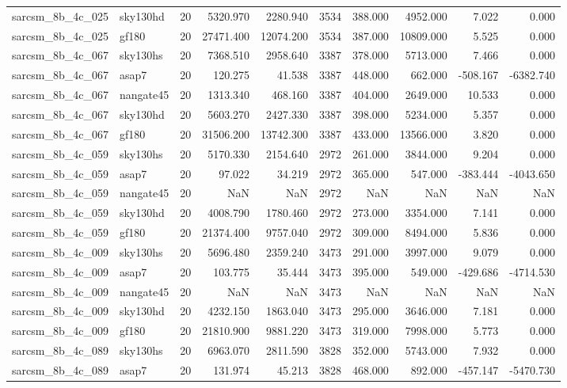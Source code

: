 \begin{longtable}{llrrrrrrrr}
sarcsm\_8b\_4c\_025 & sky130hd & 20 & 5320.970 & 2280.940 & 3534 & 388.000 & 4952.000 & 7.022 & 0.000 \\
sarcsm\_8b\_4c\_025 & gf180 & 20 & 27471.400 & 12074.200 & 3534 & 387.000 & 10809.000 & 5.525 & 0.000 \\
sarcsm\_8b\_4c\_067 & sky130hs & 20 & 7368.510 & 2958.640 & 3387 & 378.000 & 5713.000 & 7.466 & 0.000 \\
sarcsm\_8b\_4c\_067 & asap7 & 20 & 120.275 & 41.538 & 3387 & 448.000 & 662.000 & -508.167 & -6382.740 \\
sarcsm\_8b\_4c\_067 & nangate45 & 20 & 1313.340 & 468.160 & 3387 & 404.000 & 2649.000 & 10.533 & 0.000 \\
sarcsm\_8b\_4c\_067 & sky130hd & 20 & 5603.270 & 2427.330 & 3387 & 398.000 & 5234.000 & 5.357 & 0.000 \\
sarcsm\_8b\_4c\_067 & gf180 & 20 & 31506.200 & 13742.300 & 3387 & 433.000 & 13566.000 & 3.820 & 0.000 \\
sarcsm\_8b\_4c\_059 & sky130hs & 20 & 5170.330 & 2154.640 & 2972 & 261.000 & 3844.000 & 9.204 & 0.000 \\
sarcsm\_8b\_4c\_059 & asap7 & 20 & 97.022 & 34.219 & 2972 & 365.000 & 547.000 & -383.444 & -4043.650 \\
sarcsm\_8b\_4c\_059 & nangate45 & 20 & NaN & NaN & 2972 & NaN & NaN & NaN & NaN \\
sarcsm\_8b\_4c\_059 & sky130hd & 20 & 4008.790 & 1780.460 & 2972 & 273.000 & 3354.000 & 7.141 & 0.000 \\
sarcsm\_8b\_4c\_059 & gf180 & 20 & 21374.400 & 9757.040 & 2972 & 309.000 & 8494.000 & 5.836 & 0.000 \\
sarcsm\_8b\_4c\_009 & sky130hs & 20 & 5696.480 & 2359.240 & 3473 & 291.000 & 3997.000 & 9.079 & 0.000 \\
sarcsm\_8b\_4c\_009 & asap7 & 20 & 103.775 & 35.444 & 3473 & 395.000 & 549.000 & -429.686 & -4714.530 \\
sarcsm\_8b\_4c\_009 & nangate45 & 20 & NaN & NaN & 3473 & NaN & NaN & NaN & NaN \\
sarcsm\_8b\_4c\_009 & sky130hd & 20 & 4232.150 & 1863.040 & 3473 & 295.000 & 3646.000 & 7.181 & 0.000 \\
sarcsm\_8b\_4c\_009 & gf180 & 20 & 21810.900 & 9881.220 & 3473 & 319.000 & 7998.000 & 5.773 & 0.000 \\
sarcsm\_8b\_4c\_089 & sky130hs & 20 & 6963.070 & 2811.590 & 3828 & 352.000 & 5743.000 & 7.932 & 0.000 \\
sarcsm\_8b\_4c\_089 & asap7 & 20 & 131.974 & 45.213 & 3828 & 468.000 & 892.000 & -457.147 & -5470.730 \\

\end{longtable}
